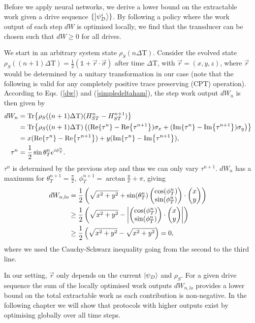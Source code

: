 Before we apply neural networks, we derive a lower bound on the extractable work given a drive sequence $\{\ket{\psi_D^i}\}$.
By following a policy where the work output of each step $dW$ is optimised locally, we find that the transducer can be chosen such that $dW \geq 0$ for all drives.

We start in an arbitrary system state $\rho_S(n \Delta \mathrm{T})$.
Consider the evolved state $\rho_S((n+1) \Delta \mathrm{T}) =\frac{1}{2} (\mathds{1} + \vec{r} \cdot \vec{\sigma})$ after time $\Delta \mathrm{T}$, with $\vec{r} = ( x, y, z )$, where $\vec{r}$ would be determined by a unitary transformation in our case (note that the following is valid for any completely positive trace preserving (CPT) operation). According to Eqs. (\ref{dw}) and (\ref{simpledeltaham}), the step work output $dW_n$ is then given by
\begin{align*}
dW_n &= \Tr{\rho_S((n+1) \Delta \mathrm{T}) (H_{ST}^{n} - H_{ST}^{n+1})} \\
&= \Tr{\rho_S((n+1) \Delta \mathrm{T}) \left((\Re{\tau^n} - \Re{\tau^{n+1}}) \sigma_x + (\Im{\tau^n} - \Im{\tau^{n+1}} ) \sigma_y \right)} \\
&= x (\Re{\tau^n} - \Re{\tau^{n+1}}) + y (\Im{\tau^n} - \Im{\tau^{n+1}}), \\
\tau^n &= \frac{1}{2} \sin{\theta_T^n} e^{i\phi_T^n}. 
\end{align*}
$\tau^n$ is determined by the previous step and thus we can only vary $\tau^{n+1}$.
$dW_n$ has a maximum for $\theta_T^{n+1} = \frac{\pi}{2}, \ \phi_T^{n+1} = \arctan{\frac{y}{x}} + \pi$, giving
\begin{align*}
dW_{n, lo} &= \frac{1}{2}\left(\sqrt{x^2 + y^2} + \sin(\theta^n_T) \begin{pmatrix} \cos(\phi^n_T) \\ \sin(\phi^n_T) \end{pmatrix} \cdot \begin{pmatrix} x \\ y \end{pmatrix} \right) \\
 &\geq \frac{1}{2}\left(\sqrt{x^2 + y^2} - \abs{ \begin{pmatrix} \cos(\phi^n_T) \\ \sin(\phi^n_T) \end{pmatrix} \cdot \begin{pmatrix} x \\ y \end{pmatrix}} \right) \\
 &\geq \frac{1}{2}\left(\sqrt{x^2 + y^2} - \sqrt{x^2 + y^2} \right) = 0,
\end{align*}
where we used the Cauchy-Schwarz inequality going from the second to the third line.

In our setting, $\vec{r}$ only depends on the current $\ket{\psi_D}$ and $\rho_S$.
For a given drive sequence the sum of the locally optimised work outputs $dW_{n, lo}$ provides a lower bound on the total extractable work as each contribution is non-negative. In the following chapter we will show that protocols with higher outputs exist by optimising globally over all time steps.
